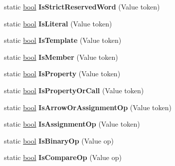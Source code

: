 \begin{DoxyCompactItemize}
static \mbox{\hyperlink{classbool}{bool}} {\bfseries Is\+Strict\+Reserved\+Word} (Value token)
\item 
\mbox{\label{classv8_1_1internal_1_1Token_aaca0419c5de7408ade09b052c2fb7423}} 
static \mbox{\hyperlink{classbool}{bool}} {\bfseries Is\+Literal} (Value token)
\item 
\mbox{\label{classv8_1_1internal_1_1Token_a412022e6e523cc651985baf7a338f201}} 
static \mbox{\hyperlink{classbool}{bool}} {\bfseries Is\+Template} (Value token)
\item 
\mbox{\label{classv8_1_1internal_1_1Token_a5c1a4fd8d214f82a919bb80509cd68e6}} 
static \mbox{\hyperlink{classbool}{bool}} {\bfseries Is\+Member} (Value token)
\item 
\mbox{\label{classv8_1_1internal_1_1Token_a7d9e322a877497bf245c13b9272f898a}} 
static \mbox{\hyperlink{classbool}{bool}} {\bfseries Is\+Property} (Value token)
\item 
\mbox{\label{classv8_1_1internal_1_1Token_aaf55c655551e8c1a60837b15ffe84c58}} 
static \mbox{\hyperlink{classbool}{bool}} {\bfseries Is\+Property\+Or\+Call} (Value token)
\item 
\mbox{\label{classv8_1_1internal_1_1Token_a1187a2d7f18902e9a0ea0db39a7bfeab}} 
static \mbox{\hyperlink{classbool}{bool}} {\bfseries Is\+Arrow\+Or\+Assignment\+Op} (Value token)
\item 
\mbox{\label{classv8_1_1internal_1_1Token_adfd13e4d7b93739f2dc344e8942148c3}} 
static \mbox{\hyperlink{classbool}{bool}} {\bfseries Is\+Assignment\+Op} (Value token)
\item 
\mbox{\label{classv8_1_1internal_1_1Token_a6c86b8c0b5c1a31d853a2edad571fb74}} 
static \mbox{\hyperlink{classbool}{bool}} {\bfseries Is\+Binary\+Op} (Value op)
\item 
\mbox{\label{classv8_1_1internal_1_1Token_a62cc331f6e96e759020975c50a9aef72}} 
static \mbox{\hyperlink{classbool}{bool}} {\bfseries Is\+Compare\+Op} (Value op)

\end{DoxyCompactItemize}
